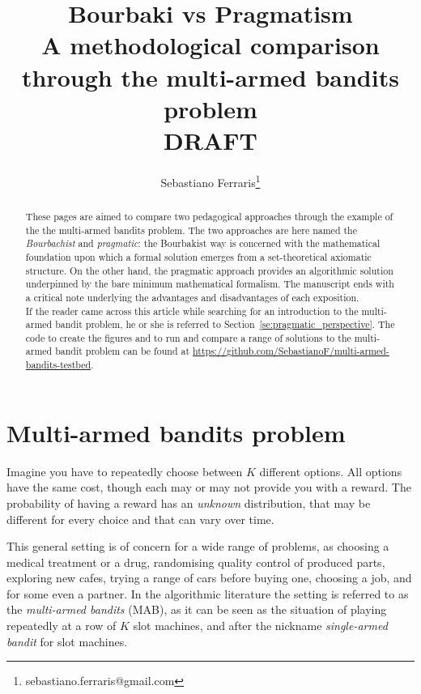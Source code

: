 \documentclass[]{scrartcl}
\title{Bourbaki vs Pragmatism \\ A methodological comparison through the multi-armed bandits problem 
 \\
 DRAFT
}
\author{Sebastiano Ferraris\footnote{sebastiano.ferraris@gmail.com}}
\theoremstyle{definition}
\begin{document}
\maketitle

\begin{abstract}
These pages are aimed to compare two pedagogical approaches through the example of the the multi-armed bandits problem. The two approaches are here named the \emph{Bourbachist} and \emph{pragmatic}: the Bourbakist way is concerned with the mathematical foundation upon which a formal solution emerges from a set-theoretical axiomatic structure. On the other hand, the pragmatic approach provides an algorithmic solution underpinned by the bare minimum mathematical formalism.
The manuscript ends with a critical note underlying the advantages and disadvantages of each exposition. \\

\noindent
If the reader came across this article while searching for an introduction to the multi-armed bandit problem, he or she is referred to Section~\ref{se:pragmatic_perspective}. The code to create the figures and to run and compare a range of solutions to the multi-armed bandit problem can be found at \href{https://github.com/SebastianoF/multi-armed-bandits-testbed}{https://github.com/SebastianoF/multi-armed-bandits-testbed}.
\end{abstract}


\section{Multi-armed bandits problem}
\label{se:intro}
Imagine you have to repeatedly choose between $K$ different options. All options have the same cost, though each may or may not provide you with a reward. The probability of having a reward has an \emph{unknown} distribution, that may be different for every choice and that can vary over time.

This general setting is of concern for a wide range of problems, as choosing a medical treatment or a drug, randomising quality control of produced parts, exploring new cafes, trying a range of cars before buying one, choosing a job, and for some even a partner. In the algorithmic literature the setting is referred to as the \emph{multi-armed bandits} (MAB), as it can be seen as the situation of playing repeatedly at a row of $K$ slot machines, and after the nickname \emph{single-armed bandit} for slot machines. 
\end{document}
